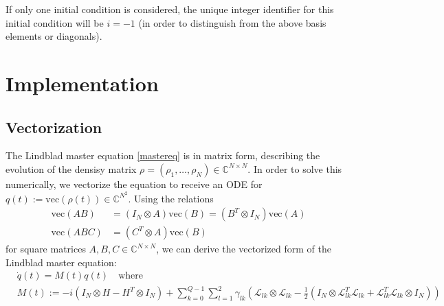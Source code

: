 \documentclass[letterpaper]{article}
\DeclareMathOperator{\Tr}{Tr}
\newcommand{\Ell}{\mathcal{L}}
\newcommand{\C}{\mathds{C}}
\begin{document}
If only one initial condition is considered, the unique integer identifier for
this initial condition will be $i=-1$ (in order to distinguish from the above
basis elements or diagonals).


\section{Implementation}

  \subsection{Vectorization}
  The Lindblad master equation \eqref{mastereq} is in matrix form, describing
  the evolution of the densisy matrix $\rho = (\rho_1, \dots, \rho_N) \in
  \C^{N\times N}$. In order to solve this numerically, we vectorize the equation
  to receive an ODE for $q(t) := \text{vec}(\rho(t)) \in \C^{N^2}$. Using the
  relations
  \begin{align}
   \text{vec}(AB) &= (I_N\otimes A)\text{vec}(B) = (B^T\otimes I_N)\text{vec}(A)
    \\
   \text{vec}(ABC) &= (C^T\otimes A)\text{vec}(B)
  \end{align}
  for square matrices $A,B,C\in\C^{N\times N}$, we can derive the vectorized
  form of the Lindblad master equation:
  \begin{align}\label{mastereq_vectorized}
    &\dot q(t) = M(t) q(t) \quad  \text{where} \\
    &M(t) := -i(I_N\otimes H - H^T \otimes I_N) + \sum_{k=0}^{Q-1}\sum_{l=1}^2 \gamma_{lk}
    \left( \Ell_{lk}\otimes \Ell_{lk} - \frac 1 2 \left( I_N\otimes
    \Ell^T_{lk}\Ell_{lk} + \Ell^T_{lk}\Ell_{lk} \otimes I_N \right) \right)
  \end{align}
\end{document}
